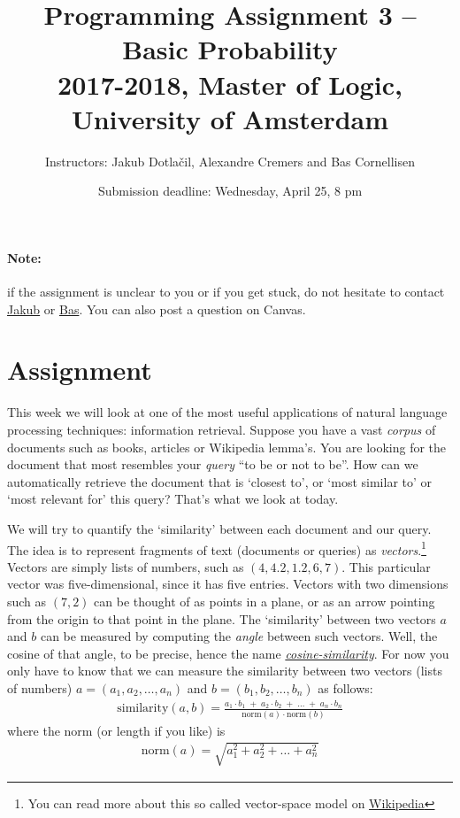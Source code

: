 \documentclass[11pt, a4paper]{article}
\title{Programming Assignment 3 -- Basic Probability \\[2mm]
\large{2017-2018, Master of Logic, University of Amsterdam}}
\author{Instructors: Jakub Dotla\v{c}il, Alexandre Cremers and Bas Cornellisen}
\date{Submission deadline: Wednesday, April 25, 8 pm}
\begin{document}
\maketitle

\paragraph{Note:} if the assignment is unclear to you or if you get stuck, do not hesitate to contact \href{mailto:j.dotlacil@uva.nl}{Jakub} or \href{mailto:bjmcornelissen@gmail.com}{Bas}. You can also post a question on Canvas.

\section{Assignment}
This week we will look at one of the most useful applications of natural language processing techniques: information retrieval. 
Suppose you have a vast \emph{corpus} of documents such as books, articles or Wikipedia lemma's.
You are looking for the document that most resembles your \emph{query} ``to be or not to be''. 
How can we automatically retrieve the document that is `closest to', or `most similar to' or `most relevant for' this query?
That's what we look at today.



We will try to quantify the `similarity' between each document and our query. 
The idea is to represent fragments of text (documents or queries) as \emph{vectors}.\footnote{You can read more about this so called vector-space model on \href{https://en.wikipedia.org/wiki/Vector_space_model}{Wikipedia}} 
Vectors are simply lists of numbers, such as $(4, 4.2, 1.2, 6, 7)$. 
This particular vector was five-dimensional, since it has five entries. 
Vectors with two dimensions such as $(7, 2)$ can be thought of as points in a plane, or as an arrow pointing from the origin to that point in the plane.
The `similarity' between two vectors $a$ and $b$ can be measured by computing the \emph{angle} between such vectors. 
Well, the cosine of that angle, to be precise, hence the name \emph{\href{https://en.wikipedia.org/wiki/Cosine_similarity}{cosine-similarity}}. 
For now you only have to know that we can measure the similarity between two vectors (lists of numbers) $a=(a_1, a_2, \dots, a_n)$ and $b = (b_1, b_2, \dots, b_n)$ as follows:
\begin{align}
  \text{similarity}(a, b) 
    = \frac{ a_1 \cdot b_1 \;+\; a_2 \cdot b_2 \;+\; \dots \;+\; a_n \cdot b_n}%
      {\text{norm}(a) \cdot \text{norm}(b)}
\end{align}
where the norm (or length if you like) is
\begin{align}
  \text{norm}(a) = \sqrt{a_1^2 + a_2^2 + \dots + a_n^2}
\end{align}
\end{document}
